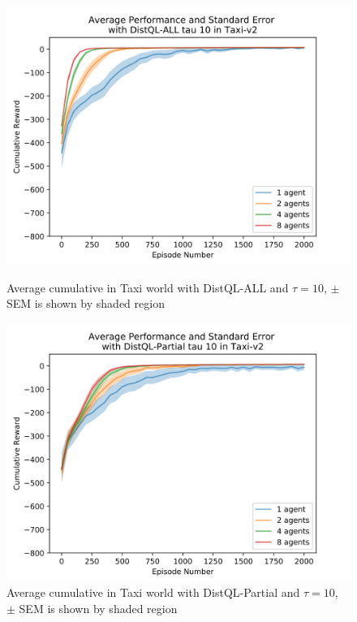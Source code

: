 \documentclass[jair,twoside,11pt,theapa]{article}
\begin{document}
\begin{figure}[h]
\centering
\begin{minipage}{.4\textwidth}
	\centering
	\includegraphics[width=1\linewidth]{resultImages/binned-Average-Performance-and-Standard-Error-with-DistQL-ALL-tau-10-in-Taxi-v2}
	\caption{Average cumulative in Taxi world with DistQL-ALL and $\tau=10$, $\pm$ SEM is shown by shaded region}
	\label{fig:DistQL-ALL-tau-10-env-Taxi}
\end{minipage}
\begin{minipage}{.4\textwidth}
	\centering
	\includegraphics[width=1\linewidth]{resultImages/binned-Average-Performance-and-Standard-Error-with-DistQL-Partial-tau-10-in-Taxi-v2}
	\caption{Average cumulative in Taxi world with DistQL-Partial and $\tau=10$, $\pm$ SEM is shown by shaded region}
	\label{fig:DistQL-Partial-tau-10-env-Taxi}
\end{minipage}
\end{figure}
\end{document}
